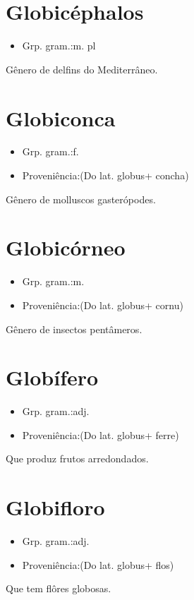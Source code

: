 \section{Globicéphalos}
\begin{itemize}
\item {Grp. gram.:m. pl}
\end{itemize}
Gênero de delfins do Mediterrâneo.
\section{Globiconca}
\begin{itemize}
\item {Grp. gram.:f.}
\end{itemize}
\begin{itemize}
\item {Proveniência:(Do lat. \textunderscore globus\textunderscore  + \textunderscore concha\textunderscore )}
\end{itemize}
Gênero de molluscos gasterópodes.
\section{Globicórneo}
\begin{itemize}
\item {Grp. gram.:m.}
\end{itemize}
\begin{itemize}
\item {Proveniência:(Do lat. \textunderscore globus\textunderscore  + \textunderscore cornu\textunderscore )}
\end{itemize}
Gênero de insectos pentâmeros.
\section{Globífero}
\begin{itemize}
\item {Grp. gram.:adj.}
\end{itemize}
\begin{itemize}
\item {Proveniência:(Do lat. \textunderscore globus\textunderscore  + \textunderscore ferre\textunderscore )}
\end{itemize}
Que produz frutos arredondados.
\section{Globifloro}
\begin{itemize}
\item {Grp. gram.:adj.}
\end{itemize}
\begin{itemize}
\item {Proveniência:(Do lat. \textunderscore globus\textunderscore  + \textunderscore flos\textunderscore )}
\end{itemize}
Que tem flôres globosas.
